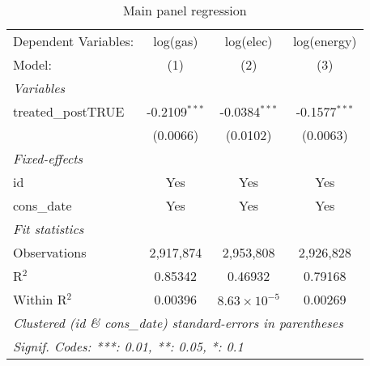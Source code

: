 
\begin{table}[htbp]
   \centering
   \caption{Main panel regression\label{tab:maintwfe}}
   \begin{tabular}{lccc}
      \tabularnewline\midrule\midrule
      Dependent Variables: & log(gas)        & log(elec)             & log(energy)\\
      Model:               & (1)             & (2)                   & (3)\\
      \midrule \emph{Variables} &   &   &  \\
      treated\_postTRUE   & -0.2109$^{***}$ & -0.0384$^{***}$       & -0.1577$^{***}$\\
                           & (0.0066)        & (0.0102)              & (0.0063)\\
      \midrule \emph{Fixed-effects} &   &   &  \\
      id                   & Yes             & Yes                   & Yes\\
      cons\_date          & Yes             & Yes                   & Yes\\
      \midrule \emph{Fit statistics} &   &   &  \\
      Observations         & 2,917,874       & 2,953,808             & 2,926,828\\
      R$^2$                & 0.85342         & 0.46932               & 0.79168\\
      Within R$^2$         & 0.00396         & $8.63\times 10^{-5}$ & 0.00269\\
      \midrule\midrule\multicolumn{4}{l}{\emph{Clustered (id \& cons\_date) standard-errors in parentheses}}\\
      \multicolumn{4}{l}{\emph{Signif. Codes: ***: 0.01, **: 0.05, *: 0.1}}\\
   \end{tabular}
\end{table}


